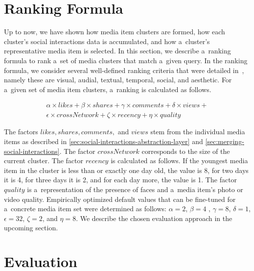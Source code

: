 \section{Ranking Formula}
\label{sec:introduction-of-a-ranking-formula}

Up to now, we have shown how media item clusters are formed,
how each cluster's social interactions data is accumulated,
and how a~cluster's representative media item is selected.
In this section, we describe a~ranking formula to rank
a~set of media clusters that match a~given query.
In the ranking formula, we consider several well-defined ranking criteria
that were detailed in~\cite{steiner2012definingaesthetic},
namely these are visual, audial, textual, temporal, social, and aesthetic.
For a~given set of media item clusters, a~ranking is calculated as follows.

\begin{gather}
  \alpha \times \mathit{likes} + \beta \times \mathit{shares} +
  \gamma \times \mathit{comments} + \delta \times \mathit{views} + \nonumber\\
  \epsilon \times \mathit{crossNetwork} + \zeta \times \mathit{recency} +
  \eta \times \mathit{quality}
\end{gather}

The factors $ \mathit{likes}, \mathit{shares}, \mathit{comments},$ and $ \mathit{views} $
stem from the individual media items as described in \autoref{sec:social-interactions-abstraction-layer}
and \autoref{sec:merging-social-interactions}.
The factor $ \mathit{crossNetwork} $ corresponds to the size of the current cluster. 
The factor $ \mathit{recency} $ is calculated as follows.
If the youngest media item in the cluster is less than or exactly one day old,
the value is 8, for two days it is 4, for three days it is 2,
and for each day more, the value is 1.
The factor $ \mathit{quality} $ is a~representation of the
presence of faces and a~media item's photo or video quality.
Empirically optimized default values
that can be fine-tuned for a~concrete media item set
were determined as follows:
$ \alpha = 2 $, $ \beta = 4 $ , $ \gamma = 8 $, $ \delta = 1 $,
$ \epsilon = 32 $, $ \zeta = 2 $, and $ \eta = 8 $.
We describe the chosen evaluation approach in the upcoming section.

\section{Evaluation}
\label{sec-chapter7-evaluation}

